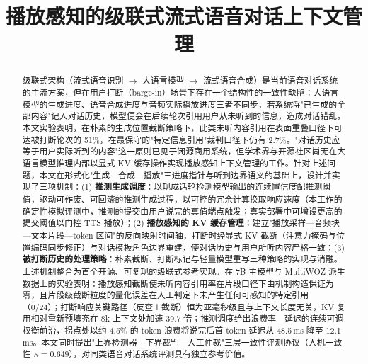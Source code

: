 \documentclass[conference]{IEEEtran}
\theoremstyle{definition}
\begin{document}
\title{播放感知的级联式流式语音对话上下文管理}

\author{
\and
{}
}

\maketitle

\begin{abstract}
级联式架构（流式语音识别 $\rightarrow$ 大语言模型 $\rightarrow$ 流式语音合成）是当前语音对话系统的主流方案，但在用户打断（barge-in）场景下存在一个结构性的一致性缺陷：大语言模型的生成进度、语音合成进度与音频实际播放进度三者不同步，若系统将"已生成的全部内容"记入对话历史，模型便会在后续轮次引用用户从未听到的信息，造成对话错乱。本文实验表明，在朴素的生成位置截断策略下，此类未听内容引用在表面重叠口径下可达被打断轮次的 51\%，在最保守的"特定信息引用"裁判口径下仍有 2.7\%。"对话历史应等于用户实际听到的内容"这一原则已见于闭源商用系统，但学术界与开源社区尚无在大语言模型推理内部以显式 KV 缓存操作实现播放感知上下文管理的工作。针对上述问题，本文在形式化"生成—合成—播放"三进度指针与听到边界语义的基础上，设计并实现了三项机制：(1) \textbf{推测生成调度}：以现成话轮检测模型输出的连续置信度配推测阈值，驱动可作废、可回滚的推测生成过程，以可控的冗余计算换取响应速度（本工作的确定性模拟评测中，推测的提交由用户说完的真值端点触发；真实部署中可增设更高的提交阈值以门控 TTS 播放）；(2) \textbf{播放感知的 KV 缓存管理}：建立"播放采样—音频块—文本片段—token 区间"的反向映射时间轴，打断时经显式 KV 截断（注意力掩码与位置编码同步修正）与对话模板角色边界重建，使对话历史与用户所听内容严格一致；(3) \textbf{被打断历史的处理策略}：朴素截断、打断标记与轻量模型重写三种策略的实现与消融。上述机制整合为首个开源、可复现的级联式参考实现。在 7B 主模型与 MultiWOZ 派生数据上的实验表明：播放感知截断使未听内容引用率在片段口径下由机制构造保证为零，且片段级截断粒度的量化误差在人工判定下未产生任何可感知的特定引用（0/24）；打断响应关键路径（反查＋截断）恒为亚毫秒级且与上下文长度无关，KV 复用相对重新预填充在 8k 上下文处加速 39.7 倍；推测调度给出浪费率—延迟的连续可调权衡前沿，拐点处以约 4.5\% 的 token 浪费将说完后首 token 延迟从 48.5\,ms 降至 12.1\,ms。本文同时提出"上界检测器—下界裁判—人工仲裁"三层一致性评测协议（人机一致性 $\kappa=0.649$），对同类语音对话系统评测具有独立参考价值。
\end{abstract}
\end{document}
